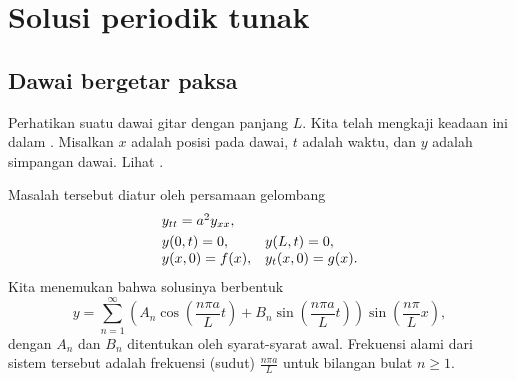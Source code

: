 
\sectionnewpage
\section{Solusi periodik tunak}
\label{sps:section}



\subsection{Dawai bergetar paksa}

Perhatikan suatu dawai gitar dengan panjang $L$.  Kita telah mengkaji 
keadaan ini dalam .
Misalkan $x$ adalah posisi pada dawai, $t$ adalah waktu, dan $y$ adalah simpangan dawai.  Lihat
.

\begin{myfig}
\capstart
{}
\caption{Dawai bergetar.\label{sps:vibstrfig}}
\end{myfig}

Masalah tersebut diatur oleh persamaan gelombang
\begin{equation} \label{sps:freevib}
\begin{array}{ll}
y_{tt} = a^2 y_{xx} , & \\
\noalign{\smallskip}
y(0,t) = 0 , & y(L,t) = 0 , \\
y(x,0) = f(x) , & y_t(x,0) = g(x) .
\end{array}
\end{equation}
Kita menemukan bahwa solusinya berbentuk
\begin{equation*}
y = 
\sum_{n=1}^\infty \left( A_n \cos \left( \frac{n\pi a}{L} t \right) +
B_n \sin \left( \frac{n\pi a}{L} t \right) \right)
\sin \left( \frac{n\pi}{L} x \right) ,
\end{equation*}
dengan $A_n$ dan $B_n$ ditentukan oleh syarat-syarat awal.  Frekuensi alami
dari sistem tersebut adalah frekuensi (sudut) $\frac{n \pi a}{L}$
untuk bilangan bulat $n \geq 1$.

